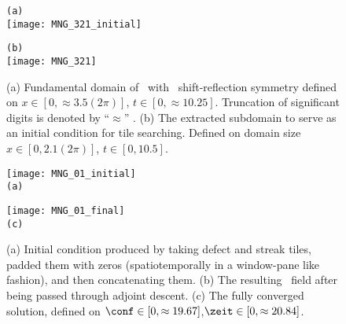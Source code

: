 \begin{description}
\begin{figure}
\begin{minipage}[height=.1\textheight]{.5\textwidth}
\centering
\small{\texttt{(a)}} \\
\texttt{[image: MNG\_321\_initial]}
\end{minipage}
\begin{minipage}[height=.1\textheight]{.5\textwidth}
\centering
\small{\texttt{(b)}} \\
\texttt{[image: MNG\_321]}
\end{minipage}
\caption{ \label{fig:threeToone}
(a) Fundamental domain of \twoT\ with \spt\
shift-reflection symmetry defined on $x \in [0,\approx 3.5(2\pi)]$, $t \in [0, \approx 10.25]$.  Truncation of significant digits is denoted by ``$\approx$'' .
(b) The extracted subdomain to serve as an
initial condition for tile searching. Defined on domain size $x \in [0,2.1(2\pi)]$, $t \in [0, 10.5]$.
}
\end{figure}


\begin{figure}[t]
\begin{minipage}[height=.30\textheight]{.30\textwidth}
\centering
\texttt{[image: MNG\_01\_initial]}
\\ \small{\texttt{(a)}}
\end{minipage}
\begin{minipage}[height=.30\textheight]{.30\textwidth}
\centering \small{
\texttt{[image: MNG\_01\_final]}
\\ \small{\texttt{(c)}}}
\end{minipage}
\caption{\label{f:MNGtiling01none}
(a) Initial condition produced by taking defect and streak tiles,
padded them with zeros (spatiotemporally in a window-pane like
fashion), and then concatenating them. (b) The resulting
\spt\ field after being passed through adjoint descent. (c)
The fully converged solution, defined on $\conf \in [0,\approx 19.67
]$,$\zeit \in [0,\approx 20.84]$.
}
\end{figure}




\end{description}
